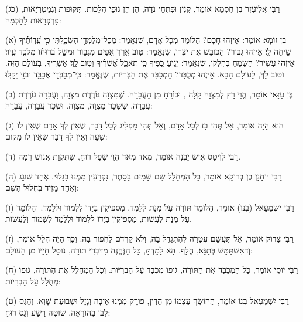 \documentclass[twoside, openany, parskip=half, 11pt]{book}
\begin{document}
(כג)
רַבִּי אֱלִיעֶזֶר בֶּן חִסְמָא אוֹמֵר, קִנִּין וּפִתְחֵי נִדָּה, הֵן הֵן גּוּפֵי הֲלָכוֹת.
תְּקוּפוֹת וְגִמַטְרְיָאוֹת, פַּרְפְּֿרָאוֹת לַחָכְמָה:


\kolyisroel

(א)
בֶּן זוֹמָא אוֹמֵר:
אֵיזֶהוּ חָכָם? הַלּוֹמֵד מִכָּל אָדָם, שֶׁנֶּאֱמַר:
 מִכָּל־מְלַמְּדַ֥י הִשְׂכַּ֑לְתִּי כִּ֥י עֵֽ֝דְוֹתֶ֗יךָ שִׂ֣יחָה לִֽי׃
אֵיזֶהוּ גִבּוֹר? הַכּוֹבֵשׁ אֶת יִצְרוֹ, שֶׁנֶּאֱמַר: 
 ט֤וֹב אֶ֣רֶךְ אַ֭פַּיִם מִגִּבּ֑וֹר וּמֹשֵׁ֥ל בְּ֝רוּח֗וֹ מִלֹּכֵ֥ד עִֽיר׃
אֵיזֶהוּ עָשִׁיר? הַשָּׂמֵחַ בְּחֶלְקוֹ, שֶׁנֶּאֱמַר:
 יְגִ֣יעַ כַּ֭פֶּיךָ כִּ֥י תֹאכֵ֑ל אַ֝שְׁרֶ֗יךָ וְט֣וֹב לָֽךְ׃ אַשְׁרֶיךָ, בָּעוֹלָם הַזֶּה. וטוֹב לָךְ, לָעוֹלָם הַבָּא.
אֵיזֶהוּ מְכֻבָּד? הַמְֿכַבֵּד אֶת הַבְּֿרִיּוֹת, שֶׁנֶּאֱמַר:
כִּֽי־מְכַבְּדַ֥י אֲכַבֵּ֖ד וּבֹזַ֥י יֵקָֽלּוּ׃

(ב)
בֶּן עַזַּאי אוֹמֵר, הֱוֵי רָץ לְמִצְוָה קַלָּה , וּבוֹרֵחַ מִן הָעֲבֵרָה.
שֶׁמִּצְוָה גּוֹרֶרֶת מִצְוָה, וַעֲבֵרָה גוֹרֶרֶת עֲבֵרָה.
שֶׁשְּֿׂכַר מִצְוָה, מִצְוָה. וּשְׂכַר עֲבֵרָה, עֲבֵרָה:

(ג)
הוּא הָיָה אוֹמֵר, אַל תְּהִי בָז לְכָל אָדָם,
וְאַל תְּהִי מַפְלִיג לְכָל דָּבָר,
שֶׁאֵין לְךָ אָדָם שֶׁאֵין לוֹ שָׁעָה וְאֵין לְךָ דָבָר שֶׁאֵין לוֹ מָקוֹם:

(ד)
רַבִּי לְוִיטָס אִישׁ יַבְנֶה אוֹמֵר, מְאֹד מְאֹד הֱוֵי שְׁפַל רוּחַ, שֶׁתִּקְוַת אֱנוֹשׁ רִמָּה.

(ה)
 רַבִּי יוֹחָנָן בֶּן בְּרוֹקָא אוֹמֵר, כָּל הַמְֿחַלֵּל שֵׁם שָׁמַיִם בַּסֵּתֶר, נִפְרָעִין מִמֶּנּוּ בַגָּלוּי.
אֶחָד שׁוֹגֵג וְאֶחָד מֵזִיד בְּחִלּוּל הַשֵּׁם:

(ו)
רַבִּי יִשְׁמָעֵאל (בְּנוֹ) אוֹמֵר, הַלּוֹמֵד תּוֹרָה עַל מְנָת לְלַמֵּד, מַסְפִּיקִין בְּיָדוֹ לִלְמוֹד וּלְֿלַמֵּד.
וְהַלּוֹמֵד עַל מְנָת לַעֲשׂוֹת, מַסְפִּיקִין בְּיָדוֹ לִלְמוֹד וּלְֿלַמֵּד לִשְׁמוֹר וְלַעֲשׂוֹת.

(ז)
רַבִּי צָדוֹק אוֹמֵר, אַל תַּעֲשֵׂם עֲטָרָה לְהִתְגַּדֵּל בָּהּ, וְלֹא קַרְדֹּם לַחְפּוֹר בָּהּ.
וְכָךְ הָיָה הִלֵּל אוֹמֵר, וְדְאִשְׁתַּמֵּשׁ בְּתַגָּא, חֳלָף.
הָא לָמַדְתָּ, כָּל הַנֶּהֱנֶה מִדִּבְרֵי תוֹרָה, נוֹטֵל חַיָּיו מִן הָעוֹלָם:

(ח)
רַבִּי יוֹסֵי אוֹמֵר, כָּל הַמְֿכַבֵּד אֶת הַתּוֹרָה, גּוּפוֹ מְכֻבָּד עַל הַבְּֿרִיּוֹת.
וְכָל הַמְֿחַלֵּל אֶת הַתּוֹרָה, גוּפוֹ מְחֻלָּל עַל הַבְּֿרִיוֹת:

(ט)
רַבִּי יִשְׁמָעֵאל בְּנוֹ אוֹמֵר, הַחוֹשֵׂךְ עַצְמוֹ מִן הַדִּין, פּוֹרֵק מִמֶּנּוּ אֵיבָה וְגָזֵל וּשְׁבוּעַת שָׁוְא.
וְהַגַּס לִבּוֹ בְהוֹרָאָה, שׁוֹטֶה רָשָׁע וְגַס רוּחַ:
\end{document}
